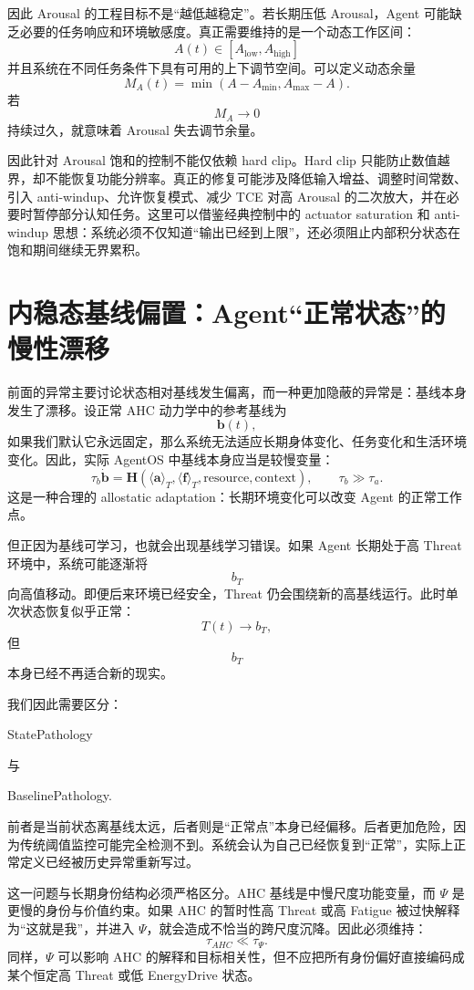 因此 Arousal 的工程目标不是“越低越稳定”。若长期压低 Arousal，Agent 可能缺乏必要的任务响应和环境敏感度。真正需要维持的是一个动态工作区间：
\[
A(t)\in
[A_{\mathrm{low}},A_{\mathrm{high}}]
\]
并且系统在不同任务条件下具有可用的上下调节空间。可以定义动态余量
\[
M_A(t)
=
\min
\left(
A-A_{\min},
A_{\max}-A
\right).
\]
若
\[
M_A\rightarrow0
\]
持续过久，就意味着 Arousal 失去调节余量。

因此针对 Arousal 饱和的控制不能仅依赖 hard clip。Hard clip 只能防止数值越界，却不能恢复功能分辨率。真正的修复可能涉及降低输入增益、调整时间常数、引入 anti-windup、允许恢复模式、减少 TCE 对高 Arousal 的二次放大，并在必要时暂停部分认知任务。这里可以借鉴经典控制中的 actuator saturation 和 anti-windup 思想：系统必须不仅知道“输出已经到上限”，还必须阻止内部积分状态在饱和期间继续无界累积。

\section{内稳态基线偏置：Agent“正常状态”的慢性漂移}
\label{sec:ahc_baseline_bias}

前面的异常主要讨论状态相对基线发生偏离，而一种更加隐蔽的异常是：基线本身发生了漂移。设正常 AHC 动力学中的参考基线为
\[
\mathbf b(t),
\]
如果我们默认它永远固定，那么系统无法适应长期身体变化、任务变化和生活环境变化。因此，实际 AgentOS 中基线本身应当是较慢变量：
\[
\tau_b\dot{\mathbf b}
=
\mathbf H
\left(
\langle\mathbf a\rangle_T,
\langle\mathbf f\rangle_T,
\text{resource},
\text{context}
\right),
\qquad
\tau_b\gg\tau_a.
\]
这是一种合理的 allostatic adaptation：长期环境变化可以改变 Agent 的正常工作点。

但正因为基线可学习，也就会出现基线学习错误。如果 Agent 长期处于高 Threat 环境中，系统可能逐渐将
\[
b_T
\]
向高值移动。即便后来环境已经安全，Threat 仍会围绕新的高基线运行。此时单次状态恢复似乎正常：
\[
T(t)\rightarrow b_T,
\]
但
\[
b_T
\]
本身已经不再适合新的现实。

我们因此需要区分：
\begin{statementbox}
StatePathology
\end{statementbox}
与
\begin{statementbox}
BaselinePathology.
\end{statementbox}
前者是当前状态离基线太远，后者则是“正常点”本身已经偏移。后者更加危险，因为传统阈值监控可能完全检测不到。系统会认为自己已经恢复到“正常”，实际上正常定义已经被历史异常重新写过。

这一问题与长期身份结构必须严格区分。AHC 基线是中慢尺度功能变量，而 $\Psi$ 是更慢的身份与价值约束。如果 AHC 的暂时性高 Threat 或高 Fatigue 被过快解释为“这就是我”，并进入 $\Psi$，就会造成不恰当的跨尺度沉降。因此必须维持：
\[
\tau_{AHC}
\ll
\tau_\Psi.
\]
同样，$\Psi$ 可以影响 AHC 的解释和目标相关性，但不应把所有身份偏好直接编码成某个恒定高 Threat 或低 EnergyDrive 状态。

